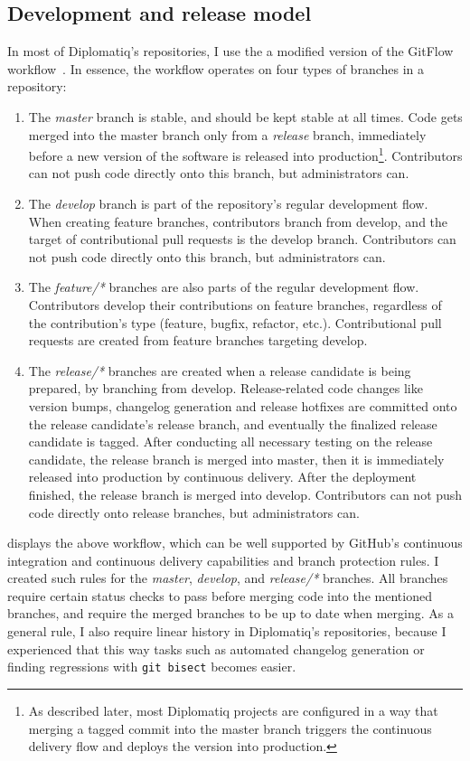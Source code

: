 \subsection{Development and release model}

In most of Diplomatiq's repositories, I use the a modified version of the GitFlow workflow~\cite{gitflow}. In essence, the workflow operates on four types of branches in a repository:

\begin{enumerate}
\item The \emph{master} branch is stable, and should be kept stable at all times. Code gets merged into the master branch only from a \emph{release} branch, immediately before a new version of the software is released into production\footnote{As described later, most Diplomatiq projects are configured in a way that merging a tagged commit into the master branch triggers the continuous delivery flow and deploys the version into production.}. Contributors can not push code directly onto this branch, but administrators can.
\item The \emph{develop} branch is part of the repository's regular development flow. When creating feature branches, contributors branch from develop, and the target of contributional pull requests is the develop branch. Contributors can not push code directly onto this branch, but administrators can.
\item The \emph{feature/*} branches are also parts of the regular development flow. Contributors develop their contributions on feature branches, regardless of the contribution's type (feature, bugfix, refactor, etc.). Contributional pull requests are created from feature branches targeting develop.
\item The \emph{release/*} branches are created when a release candidate is being prepared, by branching from develop. Release-related code changes like version bumps, changelog generation and release hotfixes are committed onto the release candidate's release branch, and eventually the finalized release candidate is tagged. After conducting all necessary testing on the release candidate, the release branch is merged into master, then it is immediately released into production by continuous delivery. After the deployment finished, the release branch is merged into develop. Contributors can not push code directly onto release branches, but administrators can.
\end{enumerate}

 displays the above workflow, which can be well supported by GitHub's continuous integration and continuous delivery capabilities and branch protection rules. I created such rules for the \emph{master}, \emph{develop}, and \emph{release/*} branches. All branches require certain status checks to pass before merging code into the mentioned branches, and require the merged branches to be up to date when merging. As a general rule, I also require linear history in Diplomatiq's repositories, because I experienced that this way tasks such as automated changelog generation or finding regressions with \lstinline{git bisect} becomes easier.

